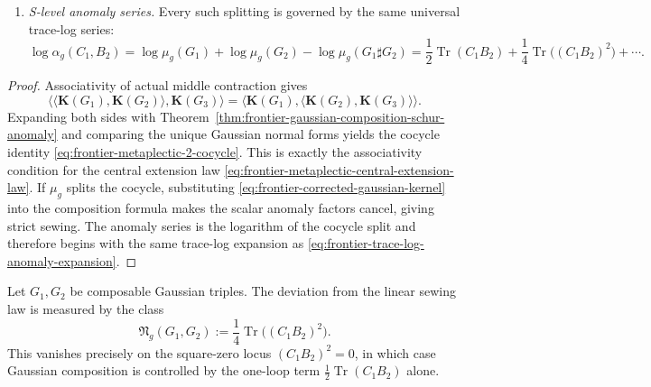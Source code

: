 \begin{theorem}
\begin{enumerate}[label=\textup{(\roman*)}]
\begin{equation}
 \widetilde{\mathbf K}(G):=\mu_g(G)^{-1}\mathbf K(G)
 \end{equation}
 compose strictly:
 \begin{equation}\label{eq:frontier-strict-corrected-sewing}
 \langle \widetilde{\mathbf K}(G_1),\widetilde{\mathbf K}(G_2)\rangle
 =
 \widetilde{\mathbf K}(G_1\sharp G_2).
 \end{equation}
\item \emph{S-level anomaly series.}
 Every such splitting is governed by the same universal trace-log series:
 \begin{equation}\label{eq:frontier-metaplectic-anomaly-series}
 \log\alpha_g(C_1,B_2)
 =
 \log\mu_g(G_1)+\log\mu_g(G_2)-\log\mu_g(G_1\sharp G_2)
 =
 \frac12\operatorname{Tr}(C_1B_2)
 + \frac14\operatorname{Tr}\bigl((C_1B_2)^2\bigr)+\cdots.
 \end{equation}
\end{enumerate}
\end{theorem}

\begin{proof}
Associativity of actual middle contraction gives
\[
\langle \langle \mathbf K(G_1),\mathbf K(G_2)\rangle,\mathbf K(G_3)\rangle
=
\langle \mathbf K(G_1),\langle \mathbf K(G_2),\mathbf K(G_3)\rangle\rangle.
\]
Expanding both sides with
Theorem~\ref{thm:frontier-gaussian-composition-schur-anomaly} and comparing the
unique Gaussian normal forms yields the cocycle identity
\eqref{eq:frontier-metaplectic-2-cocycle}. This is exactly the associativity
condition for the central extension law
\eqref{eq:frontier-metaplectic-central-extension-law}.
If $\mu_g$ splits the cocycle, substituting
\eqref{eq:frontier-corrected-gaussian-kernel} into the composition formula makes
the scalar anomaly factors cancel, giving strict sewing.
The anomaly series is the logarithm of the cocycle split and therefore begins
with the same trace-log expansion as
\eqref{eq:frontier-trace-log-anomaly-expansion}.
\end{proof}

\begin{corollary}
\label{cor:frontier-first-nonlinear-holographic-anomaly}
Let $G_1,G_2$ be composable Gaussian triples. The deviation from the linear
sewing law is measured by the class
\begin{equation}\label{eq:frontier-first-nonlinear-holographic-anomaly}
\mathfrak N_g(G_1,G_2)
:=
\frac14\operatorname{Tr}\bigl((C_1B_2)^2\bigr).
\end{equation}
This vanishes precisely on the square-zero locus $(C_1B_2)^2=0$, in which case
Gaussian composition is controlled by the one-loop term
$\tfrac12\operatorname{Tr}(C_1B_2)$ alone.
\end{corollary}

